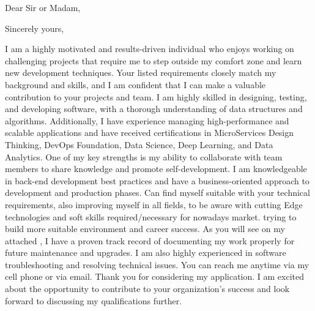 \documentclass{subfiles}
\begin{document}
\clearpage
{} %
\date{\today} %
\opening{Dear Sir or Madam,} %
\closing{Sincerely yours,} %

\makelettertitle %

I am a highly motivated and results-driven individual who enjoys working on challenging projects that require me to step outside my comfort zone and learn new development techniques.
Your listed requirements closely match my background and skills, and I am confident that I can make a valuable contribution to your projects and team.
\newline
I am highly skilled in designing, testing, and developing software, with a thorough understanding of data structures and algorithms.
Additionally, I have experience managing high-performance and scalable applications and have received certifications in MicroServices Design Thinking, DevOps Foundation, Data Science, Deep Learning, and Data Analytics.
\newline
One of my key strengths is my ability to collaborate with team members to share knowledge and promote self-development.
I am knowledgeable in back-end development best practices and have a business-oriented approach to development and production phases.
Can find myself suitable with your technical requirements, also improving myself in all fields, 
to be aware with cutting Edge technologies and soft skills required/necessary for nowadays market. 
trying to build more suitable environment and career success.
\newline
As you will see on my attached ,
I have a proven track record of documenting my work properly for future maintenance and upgrades. I am also highly experienced in software troubleshooting and resolving technical issues.
\newline
You can reach me anytime via my cell phone or via email.
Thank you for considering my application. I am excited about the opportunity to contribute to your organization's success and look forward to discussing my qualifications further.

\makeletterclosing %

\newpage
\end{document}
